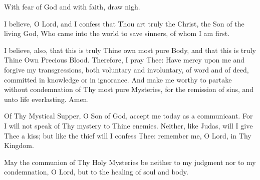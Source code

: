 \begin{liturgicaltext}
    \deacon With fear of God and with faith, draw nigh.
    \choir
\end{liturgicaltext}
\begin{liturgicaltext}
    \priest I believe, O Lord, and I confess that Thou art truly the Christ, the Son of the living God, Who came into the world to save sinners, of whom I am first.
    \item[] I believe, also, that this is truly Thine own most pure Body, and that this is truly Thine Own Precious Blood. Therefore, I pray Thee: Have mercy upon me and forgive my transgressions, both voluntary and involuntary, of word and of deed, committed in knowledge or in ignorance. And make me worthy to partake without condemnation of Thy most pure Mysteries, for the remission of sins, and unto life everlasting. Amen.
    \item[] Of Thy Mystical Supper, O Son of God, accept me today as a communicant. For I will not speak of Thy mystery to Thine enemies. Neither, like Judas, will I give Thee a kiss; but like the thief will I confess Thee: remember me, O Lord, in Thy Kingdom.
    \item[] May the communion of Thy Holy Mysteries be neither to my judgment nor to my condemnation, O Lord, but to the healing of soul and body.
\end{liturgicaltext}